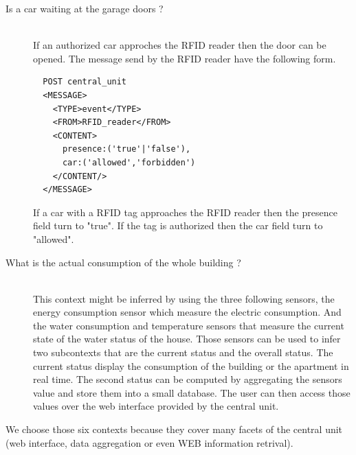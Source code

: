 \documentclass{acm_proc_article-sp}
\begin{document}
\begin{description}
 \item[Is a car waiting at the garage doors ?] \hfill \\
 If an authorized car approches the RFID reader then the door can be opened.
 The message send by the RFID reader have the following form.
  \begin{verbatim}
  POST central_unit 
  <MESSAGE>
    <TYPE>event</TYPE>
    <FROM>RFID_reader</FROM>
    <CONTENT>
      presence:('true'|'false'),
      car:('allowed','forbidden')
    </CONTENT/>
  </MESSAGE> 
\end{verbatim}
If a car with a RFID tag approaches the RFID reader then the presence field turn to "true". If the tag is authorized then the car field turn to "allowed".
 \item[What is the actual consumption of the whole building ?]\hfill \\
 This context might be inferred by using the three following sensors, the energy consumption sensor which measure the electric consumption. 
 And the water consumption and temperature sensors that measure the current state of the water status of the house.
 Those sensors can be used to infer two subcontexts that are the current status and the overall status.
 The current status display the consumption of the building or the apartment in real time.
 The second status can be computed by aggregating the sensors value and store them into a small database.
 The user can then access those values over the web interface provided by the central unit.
\end{description}
We choose those six contexts because they cover many facets of the central unit (web interface, data aggregation or even WEB information retrival).
\end{document}
